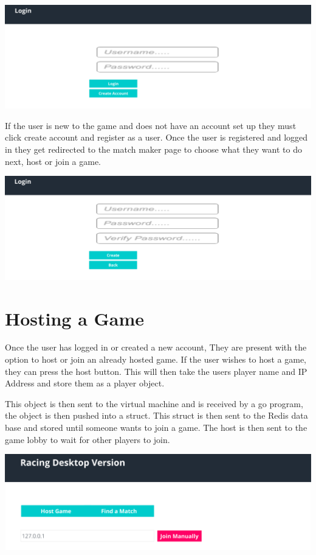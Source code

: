 \includegraphics[width=1\columnwidth]{img/LoginActual.PNG}

 If the user is new to the game and does not have an account set up they must click create account and register as a user. Once the user is registered and logged in they get redirected to the match maker page to choose what they want to do next, host or join a game. 
\newline

\includegraphics[width=1\columnwidth]{img/CreateAccountActual.PNG}

\section{Hosting a Game}
Once the user has logged in or created a new account, They are present with the option to host or join an already hosted game. If the user wishes to host a game, they can press the host button. This will then take the users player name and IP Address and store them as a player object.
\newline

This object is then sent to the virtual machine and is received by a go program, the object is then pushed into a struct. This struct is then sent to the Redis data base and stored until someone wants to join a game. The host is then sent to the game lobby to wait for other players to join. 
\newline

\includegraphics[width=1\columnwidth]{img/MatchFinder1Actual.PNG}

